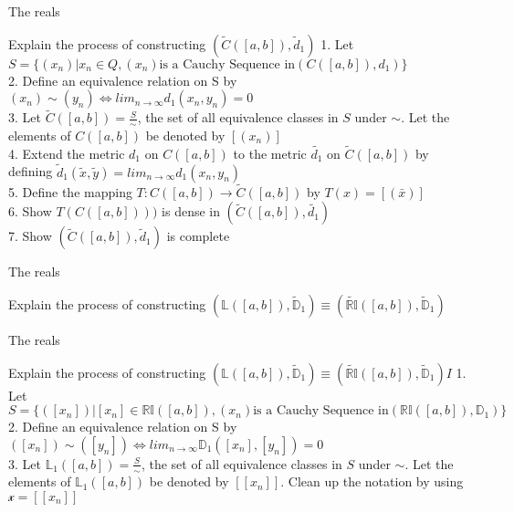 \documentclass{beamer}
\begin{document}
\begin{frame}{The reals}
        \begin{block}{Explain the process of constructing $(\widetilde{C}([a,b]),\widetilde{d}_1)$}
		1. Let $S = \{(x_n)|x_n \in Q, (x_n) \text{is a Cauchy Sequence in} (C([a,b]),d_1)\}$\\
                2. Define an equivalence relation on S by $(x_n) \sim (y_n) \iff lim_{n \rightarrow \infty} d_1(x_n,y_n) =0$\\
		3. Let $\widetilde{C}([a,b]) = \frac{S}{\sim}$, the set of all equivalence classes in $S$ under $\sim$. Let the elements of $C([a,b])$ be denoted by $[(x_n)]$\\
                4. Extend the metric $d_1$ on $C([a,b])$ to the metric $\widetilde{d_1}$ on $\widetilde{C}([a,b])$ by defining $\widetilde{d}_1(\widetilde{x},\widetilde{y}) = lim_{n \rightarrow \infty} d_1(x_n,y_n)$\\
		5. Define the mapping $T: C([a,b]) \rightarrow \widetilde{C}([a,b])$ by $T(x) = [(\bar{x})]$\\
		6. Show $T(C([a,b])))$ is dense in $(\widetilde{C}([a,b]),\widetilde{d_1})$\\
		7. Show $(\widetilde{C}([a,b]),\widetilde{d}_1)$ is complete
        \end{block}
\end{frame}

\begin{frame}{The reals}
	\begin{block}{Explain the process of constructing $(\mathbb{L}([a,b]),\widetilde{\mathbb{D}}_1) \equiv (\widetilde{\mathbb{RI}}([a,b]),\widetilde{\mathbb{D}}_1)$}
        \end{block}
\end{frame}

\begin{frame}{The reals}
        \begin{block}{Explain the process of constructing $(\mathbb{L}([a,b]),\widetilde{\mathbb{D}}_1) \equiv (\widetilde{\mathbb{RI}}([a,b]),\widetilde{\mathbb{D}}_1) I$}
		1. Let $S = \{([x_n])|[x_n] \in \mathbb{RI}([a,b]), (x_n) \text{is a Cauchy Sequence in} (\mathbb{RI}([a,b]),\mathbb{D}_1)\}$\\
		2. Define an equivalence relation on S by $([x_n]) \sim ([y_n]) \iff lim_{n \rightarrow \infty} \mathbb{D}_1([x_n],[y_n]) =0$\\
		3. Let $\mathbb{L}_1([a,b]) = \frac{S}{\sim}$, the set of all equivalence classes in $S$ under $\sim$. Let the elements of $\mathbb{L}_1([a,b])$ be denoted by $[[x_n]]$. Clean up the notation by using $\mathscr{x}  = [[x_n]]$\\
	\end{block}
\end{frame}
\end{document}
